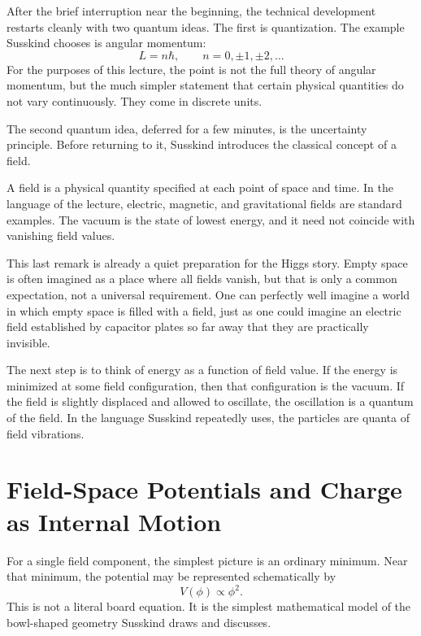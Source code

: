 After the brief interruption near the beginning, the technical development restarts cleanly with two quantum ideas. The first is quantization. The example Susskind chooses is angular momentum:
\begin{equation}
L=n\hbar,\qquad n=0,\pm1,\pm2,\dots
\end{equation}
For the purposes of this lecture, the point is not the full theory of angular momentum, but the much simpler statement that certain physical quantities do not vary continuously. They come in discrete units.

The second quantum idea, deferred for a few minutes, is the uncertainty principle. Before returning to it, Susskind introduces the classical concept of a field.

\begin{definition}
A field is a physical quantity specified at each point of space and time. In the language of the lecture, electric, magnetic, and gravitational fields are standard examples. The vacuum is the state of lowest energy, and it need not coincide with vanishing field values.
\end{definition}

This last remark is already a quiet preparation for the Higgs story. Empty space is often imagined as a place where all fields vanish, but that is only a common expectation, not a universal requirement. One can perfectly well imagine a world in which empty space is filled with a field, just as one could imagine an electric field established by capacitor plates so far away that they are practically invisible.

The next step is to think of energy as a function of field value. If the energy is minimized at some field configuration, then that configuration is the vacuum. If the field is slightly displaced and allowed to oscillate, the oscillation is a quantum of the field. In the language Susskind repeatedly uses, the particles are quanta of field vibrations.

\section{Field-Space Potentials and Charge as Internal Motion}

For a single field component, the simplest picture is an ordinary minimum. Near that minimum, the potential may be represented schematically by
\begin{equation}
V(\phi)\propto \phi^{2}.
\end{equation}
This is not a literal board equation. It is the simplest mathematical model of the bowl-shaped geometry Susskind draws and discusses.

